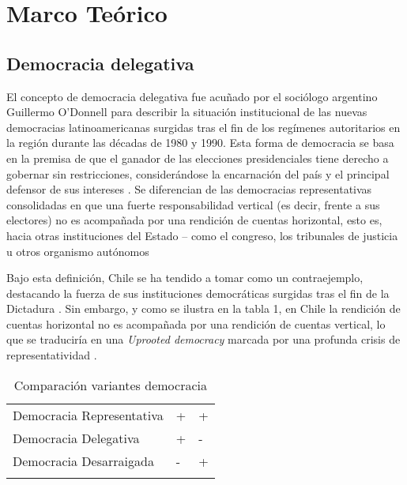 \documentclass[12pt,twoside]{templates/facsothesis}
\begin{document}
\hypertarget{marco-teuxf3rico}{%
\chapter{Marco Teórico}\label{marco-teuxf3rico}}

\hypertarget{democracia-delegativa}{%
\section{Democracia delegativa}\label{democracia-delegativa}}

El concepto de democracia delegativa fue acuñado por el sociólogo argentino Guillermo O'Donnell para describir la situación institucional de las nuevas democracias latinoamericanas surgidas tras el fin de los regímenes autoritarios en la región durante las décadas de 1980 y 1990. Esta forma de democracia se basa en la premisa de que el ganador de las elecciones presidenciales tiene derecho a gobernar sin restricciones, considerándose la encarnación del país y el principal defensor de sus intereses \citep{odonnell1994}. Se diferencian de las democracias representativas consolidadas en que una fuerte responsabilidad vertical (es decir, frente a sus electores) no es acompañada por una rendición de cuentas horizontal, esto es, hacia otras instituciones del Estado \citep{odonnell1994} -- como el congreso, los tribunales de justicia u otros organismo autónomos

Bajo esta definición, Chile se ha tendido a tomar como un contraejemplo, destacando la fuerza de sus instituciones democráticas surgidas tras el fin de la Dictadura \citep{odonnell1994, carlin2018}. Sin embargo, y como se ilustra en la tabla 1, en Chile la rendición de cuentas horizontal no es acompañada por una rendición de cuentas vertical, lo que se traduciría en una \emph{Uprooted democracy} marcada por una profunda crisis de representatividad \citep{luna2016}.

\begin{table}

\caption{\label{tab:unnamed-chunk-3}Comparación variantes democracia}
\centering
\begin{tabu} to 
\toprule
{} &  & \\
\midrule
Democracia Representativa & + & +\\
Democracia Delegativa & + & -\\
Democracia Desarraigada & - & +\\
\bottomrule
{}\\
\end{tabu}
\end{table}
\end{document}

